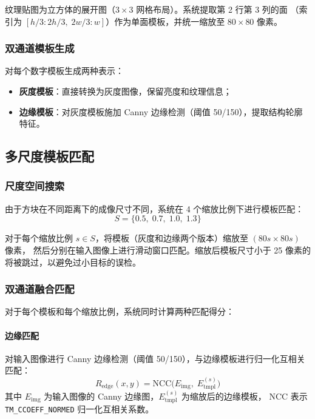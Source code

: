 \documentclass[12pt,a4paper]{article}
\begin{document}
纹理贴图为立方体的展开图（$3 \times 3$ 网格布局）。系统提取第 2 行第 3 列的面
（索引为 $[h/3 : 2h/3,\; 2w/3 : w]$）作为单面模板，并统一缩放至 $80 \times 80$ 像素。

\subsubsection{双通道模板生成}

对每个数字模板生成两种表示：
\begin{itemize}
  \item \textbf{灰度模板}：直接转换为灰度图像，保留亮度和纹理信息；
  \item \textbf{边缘模板}：对灰度模板施加 Canny 边缘检测（阈值 50/150），提取结构轮廓特征。
\end{itemize}

\subsection{多尺度模板匹配}

\subsubsection{尺度空间搜索}

由于方块在不同距离下的成像尺寸不同，系统在 4 个缩放比例下进行模板匹配：
\begin{equation}
  S = \{0.5,\; 0.7,\; 1.0,\; 1.3\}
\end{equation}

对于每个缩放比例 $s \in S$，将模板（灰度和边缘两个版本）缩放至 $(80s \times 80s)$ 像素，
然后分别在输入图像上进行滑动窗口匹配。缩放后模板尺寸小于 25 像素的将被跳过，以避免过小目标的误检。

\subsubsection{双通道融合匹配}

对于每个模板和每个缩放比例，系统同时计算两种匹配得分：

\paragraph{边缘匹配} 对输入图像进行 Canny 边缘检测（阈值 50/150），与边缘模板进行归一化互相关匹配：
\begin{equation}
  R_{\text{edge}}(x, y) = \text{NCC}\bigl(E_{\text{img}},\; E_{\text{tmpl}}^{(s)}\bigr)
\end{equation}
其中 $E_{\text{img}}$ 为输入图像的 Canny 边缘图，$E_{\text{tmpl}}^{(s)}$ 为缩放后的边缘模板，
NCC 表示 \texttt{TM\_CCOEFF\_NORMED} 归一化互相关系数。
\end{document}
